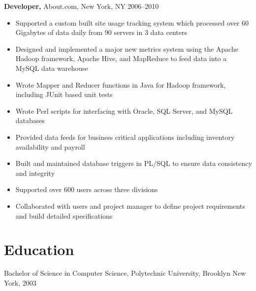 \documentclass[margin]{res}
\begin{document}
\begin{resume}
{\bf Developer,} About.com, New York, NY \hfill  2006--2010
\begin{itemize}
  \item Supported a custom built site usage tracking system which processed
    over 60 Gigabytes of data daily from 90 servers in 3 data centers
  \item Designed and implemented a major new metrics system using the Apache
    Hadoop framework, Apache Hive, and MapReduce to feed data into a MySQL data
    warehouse
  \item Wrote Mapper and Reducer functions in Java for Hadoop framework,
    including JUnit based unit tests
  \item Wrote Perl scripts for interfacing with Oracle, SQL Server, and
    MySQL databases
  \item Provided data feeds for business critical applications including
    inventory availability and payroll
  \item Built and maintained database triggers in PL/SQL to ensure data
    consistency and integrity
  \item Supported over 600 users across three divisions
  \item Collaborated with users and project manager to define project requirements
      and build detailed specifications
\end{itemize}

\section{Education}
Bachelor of Science in Computer Science, Polytechnic University, Brooklyn New
York, 2003

\end{resume}
\end{document}
